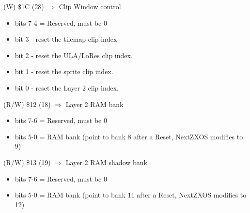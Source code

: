 (W) \$1C (28) $\Rightarrow$ Clip Window control
\begin{itemize}
\item bits 7-4 = Reserved, must be 0
\item bit 3 - reset the tilemap clip index
\item bit 2 - reset the ULA/LoRes clip index.
\item bit 1 - reset the sprite clip index.
\item bit 0 - reset the Layer 2 clip index.
\end{itemize}

(R/W) \$12 (18) $\Rightarrow$ Layer 2 RAM bank
\begin{itemize}
\item bits 7-6 = Reserved, must be 0
\item bits 5-0 = RAM bank (point to bank 8 after a Reset, NextZXOS
  modifies to 9)
\end{itemize}

(R/W) \$13 (19) $\Rightarrow$ Layer 2 RAM shadow bank
\begin{itemize}
\item bits 7-6 = Reserved, must be 0
\item bits 5-0 = RAM bank (point to bank 11 after a Reset, NextZXOS
  modifies to 12)
\end{itemize}
